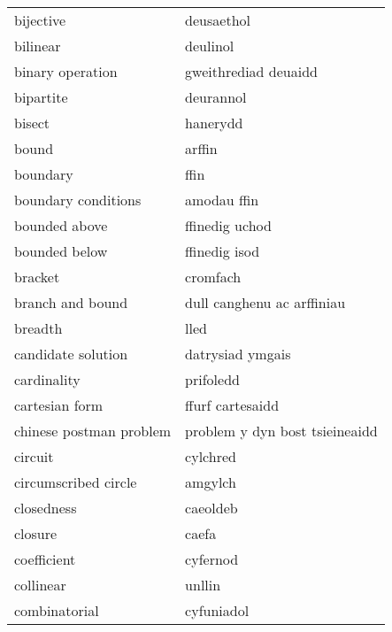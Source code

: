 \begin{supertabular}{p{0.22\textwidth}p{0.22\textwidth}}
                       bijective &                      deusaethol \\
                        bilinear &                        deulinol \\
                binary operation &            gweithrediad deuaidd \\
                       bipartite &                       deurannol \\
                          bisect &                        hanerydd \\
                           bound &                          arffin \\
                        boundary &                            ffin \\
             boundary conditions &                     amodau ffin \\
                   bounded above &                  ffinedig uchod \\
                   bounded below &                   ffinedig isod \\
                         bracket &                        cromfach \\
                branch and bound &      dull canghenu ac arffiniau \\
                         breadth &                            lled \\
              candidate solution &                datrysiad ymgais \\
                     cardinality &                       prifoledd \\
                  cartesian form &                ffurf cartesaidd \\
         chinese postman problem &  problem y dyn bost tsieineaidd \\
                         circuit &                        cylchred \\
            circumscribed circle &                         amgylch \\
                      closedness &                        caeoldeb \\
                         closure &                           caefa \\
                     coefficient &                        cyfernod \\
                       collinear &                          unllin \\
                   combinatorial &                      cyfuniadol \\

\end{supertabular}
